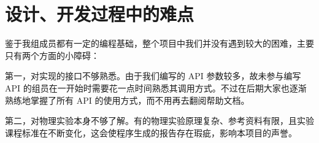 \section{设计、开发过程中的难点}

鉴于我组成员都有一定的编程基础，整个项目中我们并没有遇到较大的困难，主要只有两个方面的小障碍：

第一，对实现的接口不够熟悉。由于我们编写的 API 参数较多，故未参与编写 API 的组员在一开始时需要花一点时间熟悉其调用方式。不过在后期大家也逐渐熟练地掌握了所有 API 的使用方式，而不用再去翻阅帮助文档。

第二，对物理实验本身不够了解。有的物理实验原理复杂、参考资料有限，且实验课程标准在不断变化，这会使程序生成的报告存在瑕疵，影响本项目的声誉。